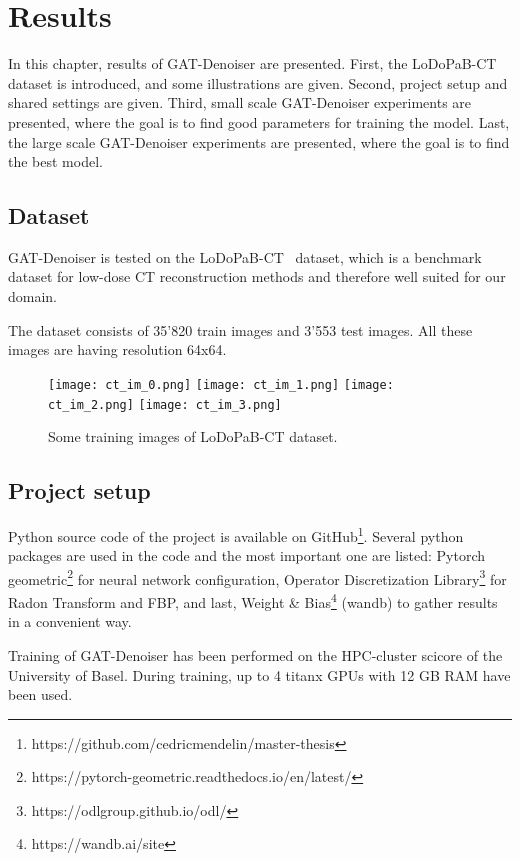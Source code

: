 \chapter{Results}
\label{sec:results}

In this chapter, results of GAT-Denoiser are presented.
First, the LoDoPaB-CT dataset is introduced, and some illustrations are given.
Second, project setup and shared settings are given.
Third, small scale GAT-Denoiser experiments are presented, where the goal is to find
good parameters for training the model.
Last, the large scale GAT-Denoiser experiments are presented, where the goal is 
to find the best model.



\section{Dataset}
GAT-Denoiser is tested on the LoDoPaB-CT~\cite{lodopab-dataset} dataset, which is a 
benchmark dataset for low-dose CT reconstruction methods and therefore well suited for our domain.

The dataset consists of 35'820 train images and 3'553 test images.
All these images are having resolution 64x64.

\begin{figure}[H]
  \centering
  \hfill
  \texttt{[image: ct\_im\_0.png]}
  \hfill
  \texttt{[image: ct\_im\_1.png]}
  \hfill
  \texttt{[image: ct\_im\_2.png]}
  \hfill
  \texttt{[image: ct\_im\_3.png]}
  \hfill
  \caption{Some training images of LoDoPaB-CT dataset.}
\end{figure}



\section{Project setup}
Python source code of the project is available on GitHub\footnote{https://github.com/cedricmendelin/master-thesis}.
Several python packages are used in the code and the most important one are listed: Pytorch geometric\footnote{https://pytorch-geometric.readthedocs.io/en/latest/} 
for neural network configuration, Operator Discretization Library\footnote{https://odlgroup.github.io/odl/} for Radon Transform and FBP, 
and last, Weight \& Bias\footnote{https://wandb.ai/site} (wandb) to gather results in a convenient way.

Training of GAT-Denoiser has been performed on the HPC-cluster scicore of the University of Basel.
During training, up to 4 titanx GPUs with 12 GB RAM have been used.



